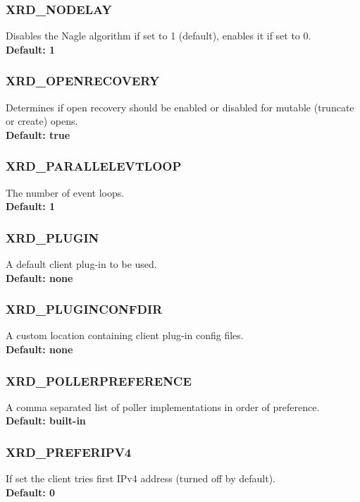 \documentclass{article}
\begin{document}
		\subsubsection{XRD_NODELAY}
		\label{env:nodelay}
		    Disables the Nagle algorithm if set to 1 (default), enables it if set to 0. \\
		    \textbf{Default: 1}
		    
		\subsubsection{XRD_OPENRECOVERY}
		\label{env:openrecovery}
			Determines if open recovery should be enabled or disabled for mutable (truncate or create) opens. \\
			\textbf{Default: true}
			
		\subsubsection{XRD_PARALLELEVTLOOP}
		\label{env:parallelevtloop}
			The number of event loops. \\
			\textbf{Default: 1}

		\subsubsection{XRD_PLUGIN}
		\label{env:plugin}
			A default client plug-in to be used. \\
			\textbf{Default: none}

		\subsubsection{XRD_PLUGINCONFDIR}
		\label{env:pluginconfigdir}
		    A custom location containing client plug-in config files. \\
		    \textbf{Default: none}
		    
		\subsubsection{XRD_POLLERPREFERENCE}
		\label{env:pollerpreference}
		    A comma separated list of poller implementations in order of preference. \\
		    \textbf{Default: built-in}

		\subsubsection{XRD_PREFERIPV4}
		\label{env:preferipv4}
		    If set the client tries first IPv4 address (turned off by default). \\
		    \textbf{Default: 0}
		    
\end{document}
